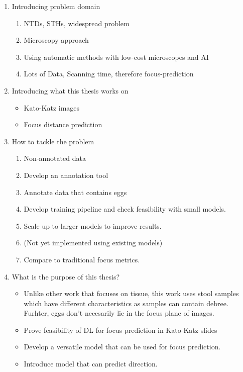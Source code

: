 \begin{enumerate}
    \item Introducing problem domain
        \begin{enumerate}
            \item NTDs, STHs, widespread problem
            \item Microscopy approach
            \item Using automatic methods with low-cost microscopes and AI
            \item Lots of Data, Scanning time, therefore focus-prediction
        \end{enumerate}
    \item Introducing what this thesis works on
        \begin{itemize}
            \item Kato-Katz images
            \item Focus distance prediction
        \end{itemize}
    \item How to tackle the problem
        \begin{enumerate}
            \item Non-annotated data
            \item Develop an annotation tool
            \item Annotate data that contains eggs
            \item Develop training pipeline and check feasibility with small models.
            \item Scale up to larger models to improve results.
            \item (Not yet implemented using existing models)
            \item Compare to traditional focus metrics.
        \end{enumerate}
    \item What is the purpose of this thesis?
        \begin{itemize}
            \item Unlike other work that focuses on tissue, this work uses stool samples which have different characteristics as samples can contain debree. Furhter, eggs don't necesarily lie in the focus plane of images.
            \item Prove feasibility of DL for focus prediction in Kato-Katz slides
            \item Develop a versatile model that can be used for focus prediction.
            \item Introduce model that can predict direction.
        \end{itemize}
\end{enumerate}
